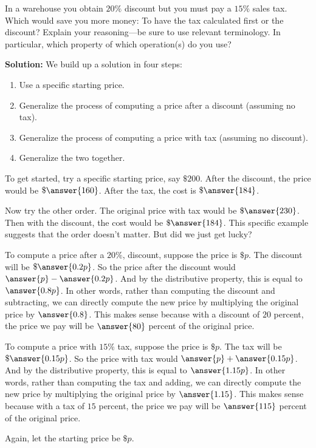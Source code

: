 \documentclass[nooutcomes]{ximera}
\begin{document}
\begin{problem}In a warehouse you obtain $20\%$ discount but you must pay a
  $15\%$ sales tax. Which would save you more money: To have the tax
  calculated first or the discount? Explain your reasoning---be sure
  to use relevant terminology.  In particular, which property 
of which operation(s) do you use?  

\textbf{Solution:}  We build up a solution in four steps: 
\begin{enumerate}
\item Use a specific starting price. 
\item Generalize the process of computing a price after a discount (assuming no tax).  
\item Generalize the process of computing a price with tax (assuming no discount). 
\item Generalize the two together. 
\end{enumerate}

To get started, try a specific starting price, say $\$200$.  After the discount, the price would be $\$\answer{160}$.  After the tax, the cost is $\$\answer{184}$.  

Now try the other order.  The original price with tax would be $\$\answer{230}$.  Then with the discount, the cost would be $\$\answer{184}$.  This specific example suggests that the order doesn't matter.  But did we just get lucky?  

\begin{problem}
To compute a price after a $20\%$, discount, suppose the price is $\$p$.  The discount will be $\$\answer{0.2p}$.  So the price after the discount would $\answer{p} - \answer{0.2p}$.  And by the distributive property, this is equal to $\answer{0.8p}$.  In other words, rather than computing the discount and subtracting, we can directly compute the new price by multiplying the original price by $\answer{0.8}$.  This makes sense because with a discount of $20$ percent, the price we pay will be $\answer{80}$ percent of the original price.  
\begin{problem}
To compute a price with $15\%$ tax, suppose the price is $\$p$.  The tax will be $\$\answer{0.15p}$.  So the price with tax would $\answer{p} + \answer{0.15p}$.  And by the distributive property, this is equal to $\answer{1.15p}$.  In other words, rather than computing the tax and adding, we can directly compute the new price by multiplying the original price by $\answer{1.15}$.  This makes sense because with a tax of $15$ percent, the price we pay will be $\answer{115}$ percent of the original price.  
\begin{problem}
Again, let the starting price be $\$p$.  


\end{problem}
\end{problem}
\end{problem}
\end{problem}
\end{document}
